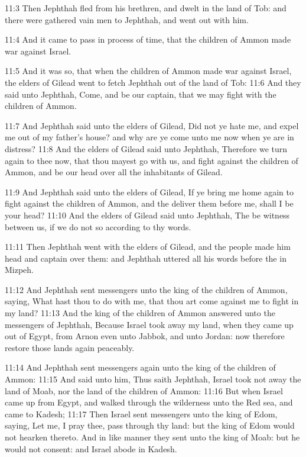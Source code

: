 11:3 Then Jephthah fled from his brethren, and dwelt in the land of
Tob: and there were gathered vain men to Jephthah, and went out with
him.

11:4 And it came to pass in process of time, that the children of
Ammon made war against Israel.

11:5 And it was so, that when the children of Ammon made war against
Israel, the elders of Gilead went to fetch Jephthah out of the land of
Tob: 11:6 And they said unto Jephthah, Come, and be our captain, that
we may fight with the children of Ammon.

11:7 And Jephthah said unto the elders of Gilead, Did not ye hate me,
and expel me out of my father's house? and why are ye come unto me now
when ye are in distress?  11:8 And the elders of Gilead said unto
Jephthah, Therefore we turn again to thee now, that thou mayest go
with us, and fight against the children of Ammon, and be our head over
all the inhabitants of Gilead.

11:9 And Jephthah said unto the elders of Gilead, If ye bring me home
again to fight against the children of Ammon, and the \LORD deliver
them before me, shall I be your head?  11:10 And the elders of Gilead
said unto Jephthah, The \LORD be witness between us, if we do not so
according to thy words.

11:11 Then Jephthah went with the elders of Gilead, and the people
made him head and captain over them: and Jephthah uttered all his
words before the \LORD in Mizpeh.

11:12 And Jephthah sent messengers unto the king of the children of
Ammon, saying, What hast thou to do with me, that thou art come
against me to fight in my land?  11:13 And the king of the children of
Ammon answered unto the messengers of Jephthah, Because Israel took
away my land, when they came up out of Egypt, from Arnon even unto
Jabbok, and unto Jordan: now therefore restore those lands again
peaceably.

11:14 And Jephthah sent messengers again unto the king of the children
of Ammon: 11:15 And said unto him, Thus saith Jephthah, Israel took
not away the land of Moab, nor the land of the children of Ammon:
11:16 But when Israel came up from Egypt, and walked through the
wilderness unto the Red sea, and came to Kadesh; 11:17 Then Israel
sent messengers unto the king of Edom, saying, Let me, I pray thee,
pass through thy land: but the king of Edom would not hearken thereto.
And in like manner they sent unto the king of Moab: but he would not
consent: and Israel abode in Kadesh.

